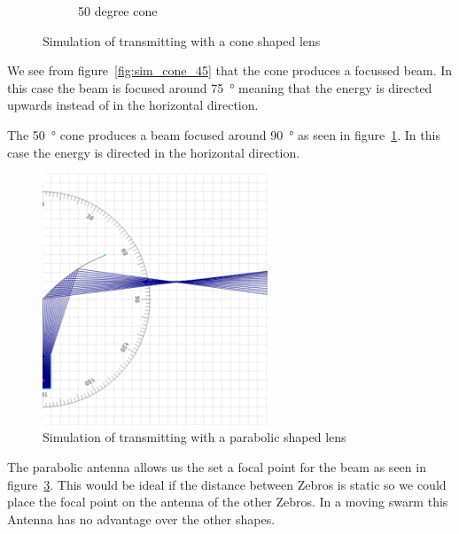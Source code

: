 \begin{figure}[H]
\begin{subfigure}{.5\textwidth}
  \caption{50 degree cone}
  \label{fig:sim_cone_50}
\end{subfigure}
\caption{Simulation of transmitting with a cone shaped lens}
\label{fig:cone}
\end{figure}


We see from figure~\ref{fig:sim_cone_45} that the cone produces a focussed beam.
In this case the beam is focused around \SI{75}{\degree} meaning that the energy is directed upwards instead of in the horizontal direction.


The \SI{50}{\degree} cone produces a beam focused around \SI{90}{\degree} as seen in figure~\ref{fig:sim_cone_50}.
In this case the energy is directed in the horizontal direction.

\begin{figure}[H]
\centering
\includegraphics[width=0.6\textwidth]{Figures/sim_par.PNG}
\caption{Simulation of transmitting with a parabolic shaped lens}
\label{fig:sim_para}
\end{figure}

The parabolic antenna allows us the set a focal point for the beam as seen in figure~\ref{fig:sim_para}.
This would be ideal if the distance between Zebros is static so we could place the focal point on the antenna of the other Zebros.
In a moving swarm this Antenna has no advantage over the other shapes.

